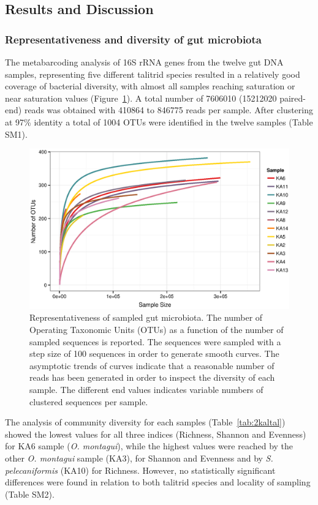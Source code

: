 \subsection{Results and Discussion}

\subsubsection{Representativeness and diversity of gut microbiota}
The metabarcoding analysis of 16S rRNA genes from the twelve gut DNA samples, representing five different talitrid species resulted in a relatively good coverage of bacterial diversity, with almost all samples reaching saturation or near saturation values (Figure~\ref{fig:1talkal}). A total number of 7606010 (15212020 paired-end) reads was obtained with 410864 to 846775 reads per sample. After clustering at 97\% identity a total of 1004 OTUs were identified in the twelve samples (Table SM1).\\
\begin{figure}[!tb]
	\centering
	\includegraphics[width=1\textwidth]{./figures/Chapter_6/Figure_1_talkaled.eps}
  	\caption{Representativeness of sampled gut microbiota. The number of Operating Taxonomic Units (OTUs) as a function of
the number of sampled sequences is reported. The sequences were sampled with a step size of 100 sequences in order to
generate smooth curves. The asymptotic trends of curves indicate that a reasonable number of reads has been generated
in order to inspect the diversity of each sample. The different end values indicates variable numbers of clustered
sequences per sample.\label{fig:1talkal}}
\end{figure}
The analysis of community diversity for each samples (Table~\ref{tab:2kaltal}) showed  the lowest values for all three indices (Richness, Shannon and Evenness) for KA6 sample (\textit{O. montagui}), while the highest values were reached by the other \textit{O. montagui} sample (KA3), for Shannon and Evenness and by \textit{S. pelecaniformis} (KA10) for Richness. However, no statistically significant differences were found in relation to both talitrid species and locality of sampling (Table SM2).\\
